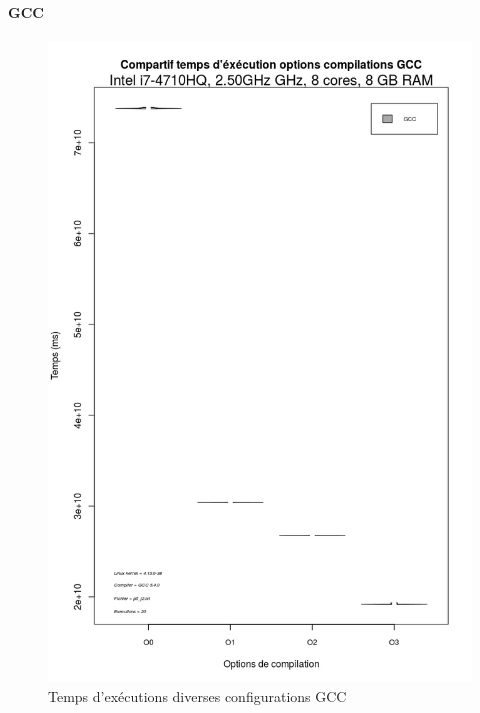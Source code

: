 \documentclass[
 aip,
 jmp,
 amsmath,amssymb,
 reprint
]{revtex4-1}
\begin{document}
\paragraph{GCC}
\begin{figure}[ht]
  \caption{Temps d'exécutions diverses configurations GCC}
  \includegraphics[width=\linewidth, keepaspectratio=true]{GCC.png}
\end{figure}
\end{document}
